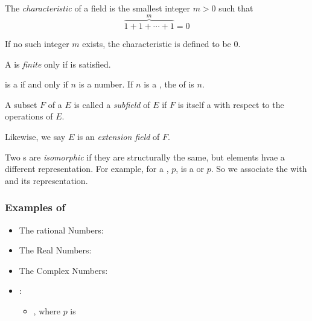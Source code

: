 \begin{definition}[Characteristic]\label{def:Field_Characteristic}
  The \emph{characteristic} of a field is the smallest integer $m > 0$ such that
  \begin{equation}\label{eq:Field_Characteristic}
    \overbrace{1 + 1 + \cdots + 1}^{m} = 0
  \end{equation}

  If no such integer $m$ exists, the characteristic is defined to be 0.
\end{definition}

\begin{definition}\label{def:Finite_Field}
  A  is \emph{finite} only if  is satisfied.
\end{definition}

\begin{theorem}\label{thm:Finite_Field}
  \TextIntsModN{} is a  if and only if $n$ is a  number.
  If $n$ is a , the  of \TextIntsModN{} is $n$.
\end{theorem}

\begin{definition}[Subfield]\label{def:Subfield}
  A subset $F$ of a  $E$ is called a \emph{subfield} of $E$ if $F$ is itself a  with respect to the operations of $E$.
  
  \begin{remark}\label{rmk:Extension_Field}
    Likewise, we say $E$ is an \emph{extension field} of $F$.
  \end{remark}
\end{definition}

\begin{definition}[Isomorphism]\label{def:Isomorphism}
  Two s are \emph{isomorphic} if they are structurally the same, but elements hvae a different representation.
  For example, for a , $p$,  is a  or  $p$.
  So we associate the   with  and its representation.
\end{definition}

\subsubsection{Examples of }\label{subsubsec:Examples_of_Fields}
\begin{itemize}[noitemsep]
\item The rational Numbers: \TextRationalNumbers{}
\item The Real Numbers: \TextRealNumbers{}
\item The Complex Numbers: \TextComplexNumbers{}
\item {}:
  \begin{itemize}[noitemsep]
  \item {}, where $p$ is 
  \end{itemize}
\end{itemize}


